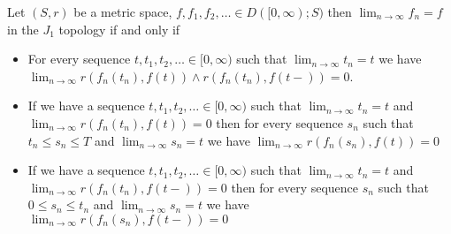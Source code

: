 \begin{prop}\label{SkorohodInfiniteJ1EquivalenceC}Let $(S,r)$ be a metric space, $f, f_1, f_2, \dotsc \in D([0,\infty); S)$ then $\lim_{n \to \infty} f_n = f$ in the $J_1$ topology if and only if 
\begin{itemize}
\item[(i)] For every sequence $t, t_1, t_2, \dotsc \in [0,\infty)$ such that $\lim_{n \to \infty} t_n = t$ we have $\lim_{n \to \infty} r(f_n(t_n), f(t)) \wedge r(f_n(t_n), f(t-)) = 0$. 
\item[(ii)] If we have a sequence $t, t_1, t_2, \dotsc \in [0,\infty)$ such that $\lim_{n \to \infty} t_n = t$ and $\lim_{n \to \infty} r(f_n(t_n), f(t)) = 0$ then for every sequence
$s_n$ such that $t_n \leq s_n \leq T$ and $\lim_{n \to \infty} s_n = t$ we have $\lim_{n \to \infty} r(f_n(s_n), f(t)) = 0$
\item[(ii)] If we have a sequence $t, t_1, t_2, \dotsc \in [0,\infty)$ such that $\lim_{n \to \infty} t_n = t$ and $\lim_{n \to \infty} r(f_n(t_n), f(t-)) = 0$ then for every sequence
$s_n$ such that $0 \leq s_n \leq t_n$ and $\lim_{n \to \infty} s_n = t$ we have $\lim_{n \to \infty} r(f_n(s_n), f(t-)) = 0$
\end{itemize}
\end{prop}
